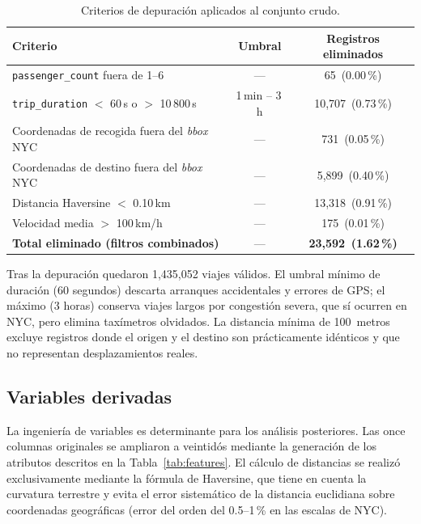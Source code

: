 \documentclass[12pt, a4paper]{article}
\begin{document}
\begin{table}[H]
  \centering
  \caption{Criterios de depuración aplicados al conjunto crudo.}
  \label{tab:limpieza}
  \small
  \begin{tabular}{lcc}
    \toprule
    \textbf{Criterio} & \textbf{Umbral} & \textbf{Registros eliminados} \\
    \midrule
    \texttt{passenger\_count} fuera de 1--6 & --- & 65 \,(0{.}00\,\%) \\
    \texttt{trip\_duration} $<$ 60\,s o $>$ 10\,800\,s & 1\,min -- 3\,h & 10{,}707 \,(0{.}73\,\%) \\
    Coordenadas de recogida fuera del \emph{bbox} NYC & --- & 731 \,(0{.}05\,\%) \\
    Coordenadas de destino fuera del \emph{bbox} NYC & --- & 5{,}899 \,(0{.}40\,\%) \\
    Distancia Haversine $<$ 0{.}10\,km & --- & 13{,}318 \,(0{.}91\,\%) \\
    Velocidad media $>$ 100\,km/h & --- & 175 \,(0{.}01\,\%) \\
    \midrule
    \textbf{Total eliminado (filtros combinados)} & --- & \textbf{23{,}592 \,(1{.}62\,\%)} \\
    \bottomrule
  \end{tabular}
\end{table}

Tras la depuración quedaron 1{,}435{,}052 viajes válidos. El umbral mínimo de duración (60 segundos) descarta arranques accidentales y errores de GPS; el máximo (3 horas) conserva viajes largos por congestión severa, que sí ocurren en NYC, pero elimina taxímetros olvidados. La distancia mínima de 100~metros excluye registros donde el origen y el destino son prácticamente idénticos y que no representan desplazamientos reales.

\subsection{Variables derivadas}

La ingeniería de variables es determinante para los análisis posteriores. Las once columnas originales se ampliaron a veintidós mediante la generación de los atributos descritos en la Tabla~\ref{tab:features}. El cálculo de distancias se realizó exclusivamente mediante la fórmula de Haversine, que tiene en cuenta la curvatura terrestre y evita el error sistemático de la distancia euclidiana sobre coordenadas geográficas (error del orden del 0{.}5--1\,\% en las escalas de NYC).
\end{document}
